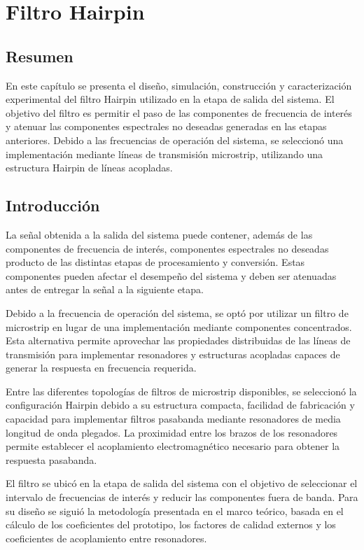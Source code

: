 \chapter{Filtro Hairpin}

\section*{Resumen}

En este capítulo se presenta el diseño, simulación, construcción y caracterización experimental del filtro Hairpin utilizado en la etapa de salida del sistema. El objetivo del filtro es permitir el paso de las componentes de frecuencia de interés y atenuar las componentes espectrales no deseadas generadas en las etapas anteriores. Debido a las frecuencias de operación del sistema, se seleccionó una implementación mediante líneas de transmisión microstrip, utilizando una estructura Hairpin de líneas acopladas.

\section{Introducción}

La señal obtenida a la salida del sistema puede contener, además de las componentes de frecuencia de interés, componentes espectrales no deseadas producto de las distintas etapas de procesamiento y conversión. Estas componentes pueden afectar el desempeño del sistema y deben ser atenuadas antes de entregar la señal a la siguiente etapa.

Debido a la frecuencia de operación del sistema, se optó por utilizar un filtro de microstrip en lugar de una implementación mediante componentes concentrados. Esta alternativa permite aprovechar las propiedades distribuidas de las líneas de transmisión para implementar resonadores y estructuras acopladas capaces de generar la respuesta en frecuencia requerida.

Entre las diferentes topologías de filtros de microstrip disponibles, se seleccionó la configuración Hairpin debido a su estructura compacta, facilidad de fabricación y capacidad para implementar filtros pasabanda mediante resonadores de media longitud de onda plegados. La proximidad entre los brazos de los resonadores permite establecer el acoplamiento electromagnético necesario para obtener la respuesta pasabanda.

El filtro se ubicó en la etapa de salida del sistema con el objetivo de seleccionar el intervalo de frecuencias de interés y reducir las componentes fuera de banda. Para su diseño se siguió la metodología presentada en el marco teórico, basada en el cálculo de los coeficientes del prototipo, los factores de calidad externos y los coeficientes de acoplamiento entre resonadores.

